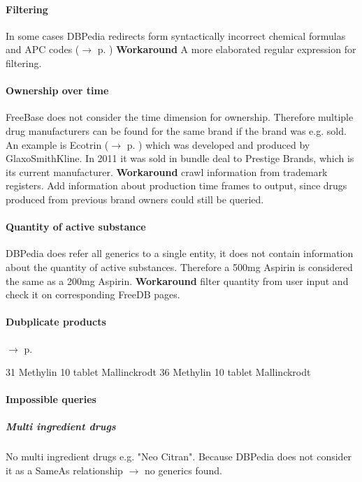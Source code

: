 \documentclass[11pt,titlepage,oneside,openany]{book}
\begin{document}
\paragraph{Filtering}
\label{limitations:filtering}
In some cases DBPedia redirects form syntactically incorrect chemical formulas and APC codes ($\rightarrow$ p. \pageref{filtering}) \textbf{Workaround} A more elaborated regular expression for filtering.

\paragraph{Ownership over time}
FreeBase does not consider the time dimension for ownership. Therefore multiple drug manufacturers can be found for the same brand if the brand was e.g. sold. An example is Ecotrin ($\rightarrow$ p. \pageref{ex:ecotrin}) which was developed and produced by GlaxoSmithKline. In 2011 it was sold in bundle deal to Prestige Brands, which is its current manufacturer.
\textbf{Workaround} crawl information from trademark registers. Add information about production time frames to output, since drugs produced from previous brand owners could still be queried.

\paragraph{Quantity of active substance}
DBPedia does refer all generics to a single entity, it does not contain information about the quantity of active substances. Therefore a 500mg Aspirin is considered the same as a 200mg Aspirin.
\textbf{Workaround} filter quantity from user input and check it on corresponding FreeDB pages.


\paragraph{Dubplicate products}
\label{limitations:dubplicates} 
$\rightarrow	$ p. \pageref{example:ritalin}

31	Methylin 10 tablet	Mallinckrodt
36	Methylin 10 tablet	Mallinckrodt

\paragraph{Impossible queries}
\label{drug_cocktail}
\subparagraph{Multi ingredient drugs} No multi ingredient drugs e.g. "Neo Citran". Because DBPedia does not consider it as a SameAs relationship $\rightarrow$ no generics found.
\end{document}
